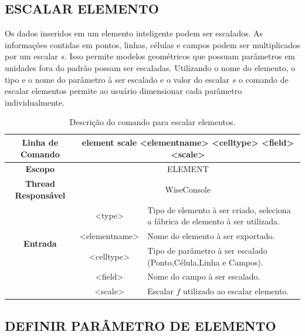 \subsection{ESCALAR ELEMENTO}\label{sec:scale_element}

Os dados inseridos em um elemento inteligente podem ser escalados. As informações contidas em pontos, linhas, células e campos podem ser multiplicados por um escalar $s$. Isso permite modelos geométricos que possuam parâmetros em unidades fora do padrão possam ser escaladas. Utilizando o nome do elemento, o tipo e o nome do parâmetro à ser escalado e o valor do escalar $s$ o comando de escalar elementos permite ao usuário dimensionar cada parâmetro individualmente.

\begin{center}
	\begin{table}[!htbp]
		\begin{tabularx}{\textwidth}{c|c|X}
			\toprule
			\textbf{Linha de Comando} & \multicolumn{2}{c}{element scale <element\underline{\space\space}name> <cell\underline{\space\space}type> <field> <scale>} \\
			\midrule
			\textbf{Escopo} & \multicolumn{2}{c}{ELEMENT} \\
			\hline
			\textbf{Thread Responsável} & \multicolumn{2}{c}{WiseConsole} \\
			\hline
			\multirow{4}{*}{\textbf{Entrada}} & <type> & Tipo de elemento à ser criado, seleciona a fábrica de elemento à ser utilizada. \\
			
			& <element\underline{\space\space}name> & Nome do elemento à ser exportado. \\
			& <cell\underline{\space\space}type> & Tipo de parâmetro à ser escalado (Ponto,Célula,Linha e Campos). \\
			& <field> & Nome do campo à ser escalado. \\
			& <scale> & Escalar $f$ utilizado ao escalar elemento. \\
			\bottomrule
		\end{tabularx}
		\caption{Descrição do comando para escalar elementos.}
		\label{tab:scale_element}
	\end{table}
\end{center}

\subsection{DEFINIR PARÂMETRO DE ELEMENTO}\label{sec:set_field_element}

